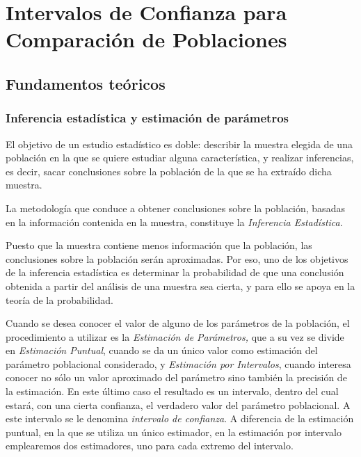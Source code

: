 
\chapter[Intervalos de Confianza para Comparación de Poblaciones]{Intervalos de Confianza para \\ Comparación de Poblaciones}

\section{Fundamentos teóricos}

\subsection{Inferencia estadística y estimación de parámetros}
El objetivo de un estudio estadístico es doble: describir la muestra elegida de una población en la que se quiere
estudiar alguna característica, y realizar inferencias, es decir, sacar conclusiones sobre la
población de la que se ha extraído dicha muestra.

La metodología que conduce a obtener conclusiones sobre la población, basadas en la información contenida en la muestra,
constituye la \emph{Inferencia Estadística}.

Puesto que la muestra contiene menos información que la población, las conclusiones sobre la población serán aproximadas. Por eso, uno de
los objetivos de la inferencia estadística es determinar la probabilidad de que una conclusión obtenida a partir del
análisis de una muestra sea cierta, y para ello se apoya en la teoría de la probabilidad.

Cuando se desea conocer el valor de alguno de los parámetros de la población, el procedimiento a utilizar es la
\emph{Estimación de Parámetros, }que a su vez se divide en \emph{Estimación Puntual}, cuando se da un único valor como
estimación del parámetro poblacional considerado, y \emph{Estimación por Intervalos}, cuando interesa conocer no sólo un
valor aproximado del parámetro sino también la precisión de la estimación. En este último caso el resultado es un
intervalo, dentro del cual estará, con una cierta confianza, el verdadero valor del parámetro poblacional. A este
intervalo se le denomina \emph{intervalo de confianza}. A diferencia de la estimación puntual, en la que se utiliza un
único estimador, en la estimación por intervalo emplearemos dos estimadores, uno para cada extremo del intervalo.

